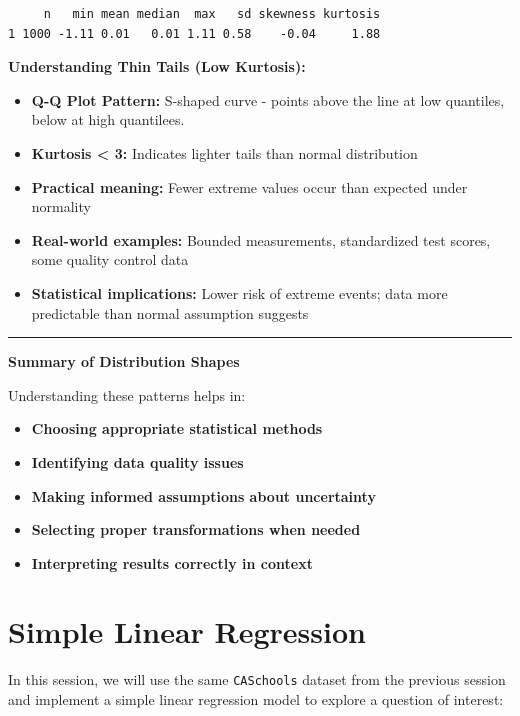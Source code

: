 \documentclass[
  12pt,
  letterpaper,
]{scrbook}
\providecommand{\tightlist}{%
  \setlength{\itemsep}{0pt}\setlength{\parskip}{0pt}}
\renewcommand{\tightlist}{\setlength{\itemsep}{0.5\baselineskip}\setlength{\parskip}{0.2\baselineskip}}
\theoremstyle{plain}
\theoremstyle{definition}
\theoremstyle{remark}
\begin{document}
\begin{verbatim}
     n   min mean median  max   sd skewness kurtosis
1 1000 -1.11 0.01   0.01 1.11 0.58    -0.04     1.88
\end{verbatim}

\textbf{Understanding Thin Tails (Low Kurtosis):}

\begin{itemize}
\tightlist
\item
  \textbf{Q-Q Plot Pattern:} S-shaped curve - points above the line at
  low quantiles, below at high quantilees.
\item
  \textbf{Kurtosis \textless{} 3:} Indicates lighter tails than normal
  distribution
\item
  \textbf{Practical meaning:} Fewer extreme values occur than expected
  under normality
\item
  \textbf{Real-world examples:} Bounded measurements, standardized test
  scores, some quality control data
\item
  \textbf{Statistical implications:} Lower risk of extreme events; data
  more predictable than normal assumption suggests
\end{itemize}

\begin{center}\rule{0.5\linewidth}{0.5pt}\end{center}

\textbf{Summary of Distribution Shapes}

Understanding these patterns helps in:

\begin{itemize}
\tightlist
\item
  \textbf{Choosing appropriate statistical methods}
\item
  \textbf{Identifying data quality issues}
\item
  \textbf{Making informed assumptions about uncertainty}
\item
  \textbf{Selecting proper transformations when needed}
\item
  \textbf{Interpreting results correctly in context}
\end{itemize}

\chapter{Simple Linear Regression}\label{simple-linear-regression}

In this session, we will use the same \texttt{CASchools} dataset from
the previous session and implement a simple linear regression model to
explore a question of interest:
\end{document}
